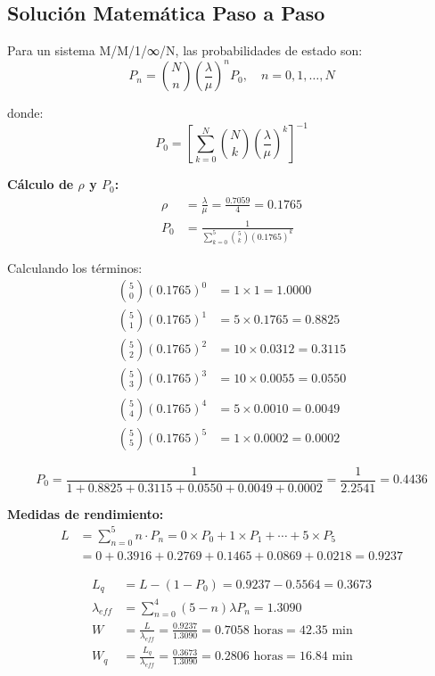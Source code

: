 \documentclass[12pt, a4paper, oneside]{book}
\theoremstyle{definition}
\begin{document}
\begin{center}
\subsection{Solución Matemática Paso a Paso}

Para un sistema M/M/1/∞/N, las probabilidades de estado son:
$$P_n = \binom{N}{n} \left(\frac{\lambda}{\mu}\right)^n P_0, \quad n = 0, 1, \ldots, N$$

donde:
$$P_0 = \left[\sum_{k=0}^{N} \binom{N}{k} \left(\frac{\lambda}{\mu}\right)^k\right]^{-1}$$

\textbf{Cálculo de $\rho$ y $P_0$:}
\begin{align*}
\rho &= \frac{\lambda}{\mu} = \frac{0.7059}{4} = 0.1765 \\
P_0 &= \frac{1}{\sum_{k=0}^{5} \binom{5}{k} (0.1765)^k}
\end{align*}

Calculando los términos:
\begin{align*}
\binom{5}{0}(0.1765)^0 &= 1 \times 1 = 1.0000 \\
\binom{5}{1}(0.1765)^1 &= 5 \times 0.1765 = 0.8825 \\
\binom{5}{2}(0.1765)^2 &= 10 \times 0.0312 = 0.3115 \\
\binom{5}{3}(0.1765)^3 &= 10 \times 0.0055 = 0.0550 \\
\binom{5}{4}(0.1765)^4 &= 5 \times 0.0010 = 0.0049 \\
\binom{5}{5}(0.1765)^5 &= 1 \times 0.0002 = 0.0002
\end{align*}

$$P_0 = \frac{1}{1 + 0.8825 + 0.3115 + 0.0550 + 0.0049 + 0.0002} = \frac{1}{2.2541} = 0.4436$$

\textbf{Medidas de rendimiento:}
\begin{align*}
L &= \sum_{n=0}^{5} n \cdot P_n = 0 \times P_0 + 1 \times P_1 + \cdots + 5 \times P_5 \\
&= 0 + 0.3916 + 0.2769 + 0.1465 + 0.0869 + 0.0218 = 0.9237
\end{align*}

\begin{align*}
L_q &= L - (1 - P_0) = 0.9237 - 0.5564 = 0.3673 \\
\lambda_{eff} &= \sum_{n=0}^{4} (5-n) \lambda P_n = 1.3090 \\
W &= \frac{L}{\lambda_{eff}} = \frac{0.9237}{1.3090} = 0.7058 \text{ horas} = 42.35 \text{ min} \\
W_q &= \frac{L_q}{\lambda_{eff}} = \frac{0.3673}{1.3090} = 0.2806 \text{ horas} = 16.84 \text{ min}
\end{align*}


\end{center}
\end{document}

